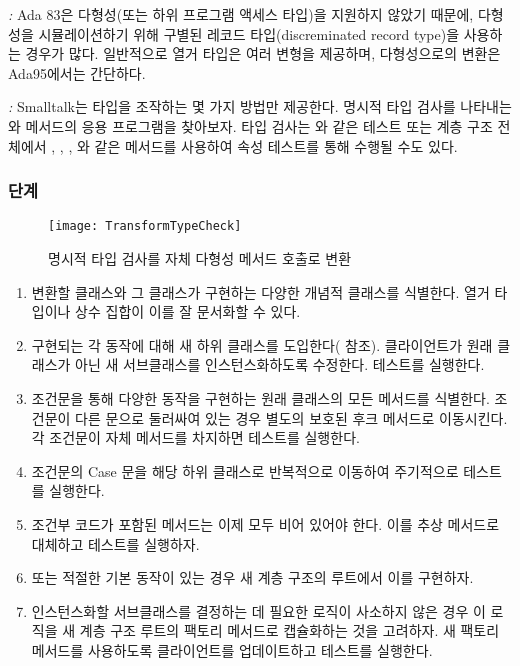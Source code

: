 \documentclass[a4paper,10pt,twoside]{book}
\begin{document}
\begin{bulletlist}
\item \emph{:}
Ada 83은 다형성(또는 하위 프로그램 액세스 타입)을 지원하지 않았기 때문에, 다형성을 시뮬레이션하기 위해 구별된 레코드 타입(discreminated record type)을 사용하는 경우가 많다. 일반적으로 열거 타입은 여러 변형을 제공하며, 다형성으로의 변환은 Ada95에서는 간단하다.

\item \emph{:}
Smalltalk는 타입을 조작하는 몇 가지 방법만 제공한다. 명시적 타입 검사를 나타내는 와  메서드의 응용 프로그램을 찾아보자. 타입 검사는 와 같은 테스트 또는 계층 구조 전체에서 , , , 와 같은 메서드를 사용하여 속성 테스트를 통해 수행될 수도 있다.
\end{bulletlist}

\subsubsection*{단계}

\begin{figure}[tb]
\begin{center}
\texttt{[image: TransformTypeCheck]}
\caption{명시적 타입 검사를 자체 다형성 메서드 호출로 변환}
\end{center}
\end{figure}


\begin{enumerate}
\item 변환할 클래스와 그 클래스가 구현하는 다양한 개념적 클래스를 식별한다. 열거 타입이나 상수 집합이 이를 잘 문서화할 수 있다.

\item 구현되는 각 동작에 대해 새 하위 클래스를 도입한다( 참조). 클라이언트가 원래 클래스가 아닌 새 서브클래스를 인스턴스화하도록 수정한다. 테스트를 실행한다.

\item 조건문을 통해 다양한 동작을 구현하는 원래 클래스의 모든 메서드를 식별한다. 조건문이 다른 문으로 둘러싸여 있는 경우 별도의 보호된 후크 메서드로 이동시킨다. 각 조건문이 자체 메서드를 차지하면 테스트를 실행한다.

\item 조건문의 Case 문을 해당 하위 클래스로 반복적으로 이동하여 주기적으로 테스트를 실행한다.

\item 조건부 코드가 포함된 메서드는 이제 모두 비어 있어야 한다. 이를 추상 메서드로 대체하고 테스트를 실행하자.

\item 또는 적절한 기본 동작이 있는 경우 새 계층 구조의 루트에서 이를 구현하자.

\item 인스턴스화할 서브클래스를 결정하는 데 필요한 로직이 사소하지 않은 경우 이 로직을 새 계층 구조 루트의 팩토리 메서드로 캡슐화하는 것을 고려하자. 새 팩토리 메서드를 사용하도록 클라이언트를 업데이트하고 테스트를 실행한다.
\end{enumerate}
\end{document}
